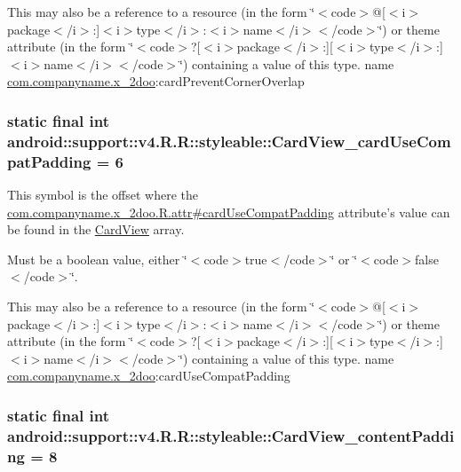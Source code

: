 This may also be a reference to a resource (in the form \char`\"{}$<$code$>$@\mbox{[}$<$i$>$package$<$/i$>$:\mbox{]}$<$i$>$type$<$/i$>$:$<$i$>$name$<$/i$>$$<$/code$>$\char`\"{}) or theme attribute (in the form \char`\"{}$<$code$>$?\mbox{[}$<$i$>$package$<$/i$>$:\mbox{]}\mbox{[}$<$i$>$type$<$/i$>$:\mbox{]}$<$i$>$name$<$/i$>$$<$/code$>$\char`\"{}) containing a value of this type.  name \hyperlink{namespacecom_1_1companyname_1_1x__2doo}{com.companyname.x\_\-2doo}:cardPreventCornerOverlap \hypertarget{classandroid_1_1support_1_1v4_1_1_r_1_1styleable_5fa6aadc3bb0cfa41fd1cf7e91655290}{
\subsubsection[{CardView\_\-cardUseCompatPadding}]{\setlength{\rightskip}{0pt plus 5cm}static final int android::support::v4.R.R::styleable::CardView\_\-cardUseCompatPadding = 6}}
\label{classandroid_1_1support_1_1v4_1_1_r_1_1styleable_5fa6aadc3bb0cfa41fd1cf7e91655290}


This symbol is the offset where the \hyperlink{classcom_1_1companyname_1_1x__2doo_1_1_r_1_1attr_f2e8bb945e46330483929fb68bce113d}{com.companyname.x\_\-2doo.R.attr\#cardUseCompatPadding} attribute's value can be found in the \hyperlink{classandroid_1_1support_1_1v4_1_1_r_1_1styleable_4fcc6453aa91deadd7072add3aee5e56}{CardView} array.

Must be a boolean value, either \char`\"{}$<$code$>$true$<$/code$>$\char`\"{} or \char`\"{}$<$code$>$false$<$/code$>$\char`\"{}. 

This may also be a reference to a resource (in the form \char`\"{}$<$code$>$@\mbox{[}$<$i$>$package$<$/i$>$:\mbox{]}$<$i$>$type$<$/i$>$:$<$i$>$name$<$/i$>$$<$/code$>$\char`\"{}) or theme attribute (in the form \char`\"{}$<$code$>$?\mbox{[}$<$i$>$package$<$/i$>$:\mbox{]}\mbox{[}$<$i$>$type$<$/i$>$:\mbox{]}$<$i$>$name$<$/i$>$$<$/code$>$\char`\"{}) containing a value of this type.  name \hyperlink{namespacecom_1_1companyname_1_1x__2doo}{com.companyname.x\_\-2doo}:cardUseCompatPadding \hypertarget{classandroid_1_1support_1_1v4_1_1_r_1_1styleable_5c42c3e1c3a5864233a443fd167fc4e3}{
\subsubsection[{CardView\_\-contentPadding}]{\setlength{\rightskip}{0pt plus 5cm}static final int android::support::v4.R.R::styleable::CardView\_\-contentPadding = 8}}
\label{classandroid_1_1support_1_1v4_1_1_r_1_1styleable_5c42c3e1c3a5864233a443fd167fc4e3}


